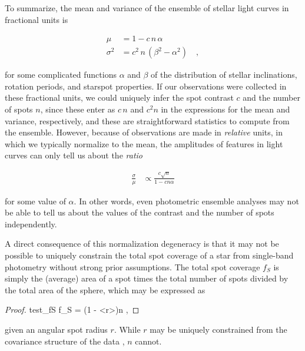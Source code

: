 \documentclass[modern,linenumbers]{aastex62}
\begin{document}
To summarize, the mean and variance of the ensemble of stellar light curves
in fractional units is
%
\begin{linenomath}\begin{align}
        \mu      & = 1 - c \, n \, \alpha
        \nonumber                                     \\
        \sigma^2 & = c^2 \, n \, (\beta^2 - \alpha^2)
        \quad,
    \end{align}\end{linenomath}
%
for some complicated functions $\alpha$ and $\beta$ of the distribution of
stellar inclinations,
rotation periods, and starspot properties.
%
If our observations were collected in these fractional units,
we could uniquely infer the spot contrast $c$ and the number of spots $n$,
since these enter as $c \, n$ and $c^2 n$ in the expressions for the mean
and variance, respectively, and these are straightforward statistics to
compute from the ensemble.
%
However, because of observations are made in \emph{relative} units, in which
we typically normalize to the mean, the amplitudes of features in light curves
can only tell us about the \emph{ratio}
%
\begin{linenomath}\begin{align}
        \label{eq:ratio}
        \frac{\sigma}{\mu}
         & \propto \frac{c \sqrt{n}}{1 - c n \alpha}
    \end{align}\end{linenomath}
%
for some value of $\alpha$.
In other words, even photometric ensemble analyses may not be able to tell
us about the values of the contrast and the number of spots independently.

A direct consequence of this normalization degeneracy is that it may not be
possible to uniquely constrain the total spot coverage of a star from
single-band photometry without strong prior assumptions.
The total spot coverage $f_S$
is simply the (average) area of a spot
times the total number of spots divided by the total area of the sphere, which
may be expressed as
%
\begin{linenomath}\begin{proof}{test_fS}
        \label{eq:fS}
        f_S = \left(1 - \left<\cos r\right>\right)n
        \quad,
    \end{proof}\end{linenomath}
%
given an angular spot radius $r$.
While $r$ may be uniquely constrained from the covariance structure of the data
, $n$ cannot.
\end{document}
